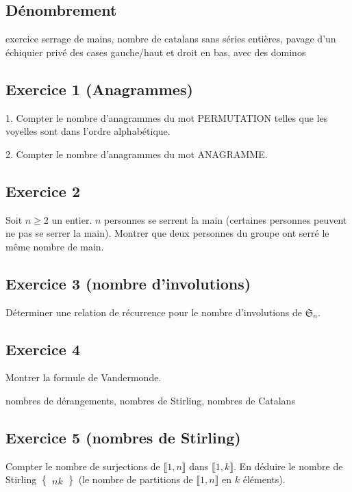 \documentclass{article}
\renewcommand{\k}{\llbracket 1, k \rrbracket}
\newcommand{\n}{\llbracket 1, n \rrbracket}
\begin{document}
\subsection{Dénombrement}

exercice serrage de mains, nombre de catalans sans séries entières, pavage d'un échiquier privé des cases gauche/haut et droit en bas, avec des dominos  

\subsection*{Exercice 1 (Anagrammes)} 

1. Compter le nombre d'anagrammes du mot PERMUTATION telles que les voyelles sont dans l'ordre alphabétique.  

2. Compter le nombre d'anagrammes du mot ANAGRAMME. 

\subsection*{Exercice 2}  

Soit $n\geqslant 2$ un entier. $n$ personnes se serrent la main (certaines personnes peuvent ne pas se serrer la main). Montrer que deux personnes du groupe ont serré le même nombre de main.    

\subsection*{Exercice 3 (nombre d'involutions)}  

Déterminer une relation de récurrence pour le nombre d'involutions de $\mathfrak{S}_n$. 

\subsection*{Exercice 4} 

Montrer la formule de Vandermonde. 

nombres de dérangements, nombres de Stirling, nombres de Catalans 

\subsection*{Exercice 5 (nombres de Stirling)} 

Compter le nombre de surjections de $\n$ dans $\k$. En déduire le nombre de Stirling $\begin{Bmatrix}
  n 
  k 
\end{Bmatrix}$ (le nombre de partitions de $\n$ en $k$ éléments). 
\end{document}
